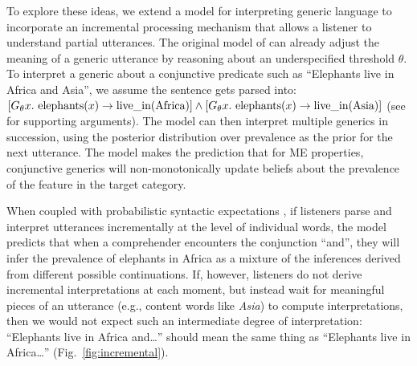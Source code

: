 \documentclass[letterpaper, 12pt]{article}
\begin{document}
To explore these ideas, we extend a model for interpreting generic language to incorporate an incremental processing mechanism that allows a listener to understand partial utterances.
The original model of  can already adjust the meaning of a generic utterance by reasoning about an underspecified threshold $\theta$.
To interpret a generic about a conjunctive predicate such as ``Elephants live in Africa and Asia'', we assume the sentence gets parsed into: $[G_\theta x. \textnormal{ elephants}(x) \to \textnormal{live\_in}(\textnormal{Africa})] \land [G_\theta x. \textnormal{ elephants}(x) \to \textnormal{live\_in}(\textnormal{Asia})]$ (see  for supporting arguments).
The model can then interpret multiple generics in succession, using the posterior distribution over prevalence as the prior for the next utterance. 
The model makes the prediction that for ME properties, conjunctive generics will non-monotonically update beliefs about the prevalence of the feature in the target category. 

When coupled with probabilistic syntactic expectations \cite{Levy2008}, if listeners parse and interpret utterances incrementally at the level of individual words, the model predicts that when a comprehender encounters the conjunction ``and'', they will infer the prevalence of elephants in Africa as a mixture of the inferences derived from different possible continuations.
If, however, listeners do not derive incremental interpretations at each moment, but instead wait for meaningful pieces of an utterance (e.g., content words like \emph{Asia}) to compute interpretations, then we would not expect such an intermediate degree of interpretation: ``Elephants live in Africa and\ldots'' should mean the same thing as ``Elephants live in Africa\ldots'' (Fig.~\ref{fig:incremental}). 

\end{document}
